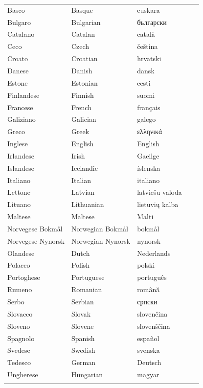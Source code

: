 \cleardoublepage

\label{whitepaperseries}

\vspace*{-5mm}
\centering
  \setlength{\tabcolsep}{3.5em}
  \begin{tabularx}{\textwidth}{lllll} \toprule\addlinespace
  Basco & Basque & euskara\\
  Bulgaro & Bulgarian & български\\
  Catalano & Catalan & català\\
  Ceco & Czech & čeština\\
  Croato & Croatian & hrvatski\\
  Danese & Danish & dansk\\
  Estone & Estonian & eesti\\
  Finlandese & Finnish & suomi\\
  Francese & French & français\\
  Galiziano & Galician & galego\\
  Greco & Greek & ελληνικά\\
  Inglese & English & English\\
  Irlandese & Irish & Gaeilge\\
  Islandese & Icelandic & íslenska\\
  Italiano & Italian & italiano\\
  Lettone & Latvian & latviešu valoda\\
  Lituano & Lithuanian & lietuvių kalba\\
  Maltese & Maltese & Malti\\
  Norvegese Bokmål & Norwegian Bokmål & bokmål\\
  Norvegese Nynorsk & Norwegian Nynorsk & nynorsk\\
  Olandese & Dutch & Nederlands\\
  Polacco & Polish & polski\\
  Portoghese & Portuguese & português\\
  Rumeno & Romanian & română\\
  Serbo & Serbian & српски\\
  Slovacco & Slovak & slovenčina\\
  Sloveno & Slovene & slovenščina\\
  Spagnolo & Spanish & español\\
  Svedese & Swedish & svenska\\
  Tedesco & German & Deutsch\\
  Ungherese & Hungarian & magyar\\ \addlinespace \bottomrule
\end{tabularx}

